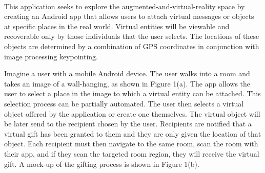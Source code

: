 \paragraph{}
This application seeks to explore the augmented-and-virtual-reality space by creating an Android app that allows users to attach virtual messages or objects at specific places in the real world. Virtual entities will be viewable and recoverable only by those individuals that the user selects. The locations of these objects are determined by a combination of GPS coordinates in conjunction with image processing keypointing.
\par Imagine a user with a mobile Android device. The user walks into a room and takes an image of a wall-hanging, as shown in Figure 1(a). The app allows the user to select a place in the image to which a virtual entity can be attached. This selection process can be partially automated. The user then selects a virtual object offered by the application or create one themselves. The virtual object will be later send to the recipient chosen by the user. Recipients are notified that a virtual gift has been granted to them and they are only given the location of that object. Each recipient must then navigate to the same room, scan the room with their app, and if they scan the targeted room region, they will receive the virtual gift. A mock-up of the gifting process is shown in Figure 1(b).

